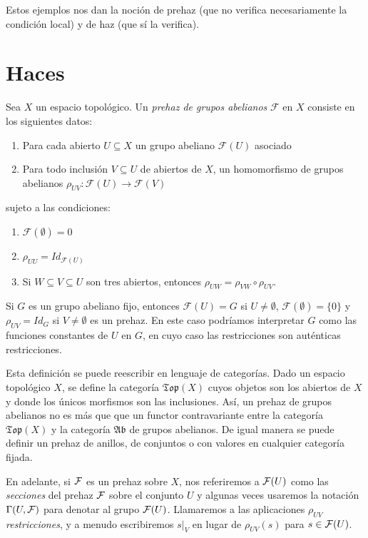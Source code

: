 \documentclass[GA.tex]{subfiles}
\begin{document}
Estos ejemplos nos dan la noción de prehaz (que no verifica necesariamente la condición local) y de haz (que sí la verifica).

\section{Haces}

\begin{defi}
Sea $X$ un espacio topológico. Un \emph{prehaz de grupos abelianos} $\mathcal{F}$ en $X$ consiste en los siguientes datos:
\begin{enumerate}
\item Para cada abierto $U\subseteq X$ un grupo abeliano $\mathcal{F}(U)$ asociado
\item Para todo inclusión $V\subseteq U$ de abiertos de $X$, un homomorfismo de grupos abelianos $\rho_{UV}:\mathcal{F}(U)\to\mathcal{F}(V)$
\end{enumerate}
sujeto a las condiciones:
\begin{enumerate}
\item $\mathcal{F}(\emptyset)=0$
\item $\rho_{UU}=Id_{\mathcal{F}(U)}$
\item Si $W\subseteq V\subseteq U$ son tres abiertos, entonces $\rho_{UW}=\rho_{VW}\circ \rho_{UV}$.
\end{enumerate}

\end{defi}

\begin{ej}
Si $G$  es un grupo abeliano fijo, entonces $\mathcal{F}(U)=G$ si $U\neq\emptyset$, $\mathcal{F}(\emptyset)=\{0\}$ y $\rho_{UV}=Id_G$ si $V\neq \emptyset$ es un prehaz. En este caso podríamos interpretar $G$ como las funciones constantes de $U$ en $G$, en cuyo caso las restricciones son auténticas restricciones.
\end{ej}

Esta definición se puede reescribir en lenguaje de categorías. Dado un espacio topológico $X$, se define la categoría $\mathfrak{Top}(X)$ cuyos objetos son los abiertos de $X$ y donde los únicos morfismos son las inclusiones. Así, un prehaz de grupos abelianos no es más que que un functor contravariante entre la categoría $\mathfrak{Top}(X)$ y la categoría $\mathfrak{Ab}$ de grupos abelianos. De igual manera se puede definir un prehaz de anillos, de conjuntos o con valores en cualquier categoría fijada.

En adelante, si $\mathcal{F}$ es un prehaz sobre $X$, nos referiremos a $\mathcal{F}(U)$ como las \emph{secciones} del prehaz $\mathcal{F}$ sobre el conjunto $U$ y algunas veces usaremos la notación $\Gamma(U,\mathcal{F})$ para denotar al grupo $\mathcal{F}(U)$. Llamaremos a las aplicaciones $\rho_{UV}$ \emph{restricciones}, y a menudo escribiremos $s|_V$ en lugar de $\rho_{UV}(s)$ para $s\in\mathcal{F}(U)$. 
\end{document}
